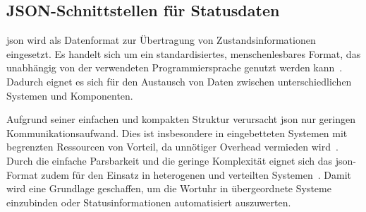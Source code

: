 \subsection{JSON-Schnittstellen für Statusdaten}
\gls{json} wird als Datenformat zur Übertragung von Zustandsinformationen eingesetzt.
Es handelt sich um ein standardisiertes, menschenlesbares Format, das unabhängig von der verwendeten Programmiersprache genutzt werden kann~\cite{wehner_json_iot}.
Dadurch eignet es sich für den Austausch von Daten zwischen unterschiedlichen Systemen und Komponenten.

Aufgrund seiner einfachen und kompakten Struktur verursacht \gls{json} nur geringen Kommunikationsaufwand.
Dies ist insbesondere in eingebetteten Systemen mit begrenzten Ressourcen von Vorteil, da unnötiger Overhead vermieden wird~\cite{wehner_json_iot}.
Durch die einfache Parsbarkeit und die geringe Komplexität eignet sich das \gls{json}-Format zudem für den Einsatz in heterogenen und verteilten Systemen~\cite{wehner_json_iot}.
Damit wird eine Grundlage geschaffen, um die Wortuhr in übergeordnete Systeme einzubinden oder Statusinformationen automatisiert auszuwerten.


